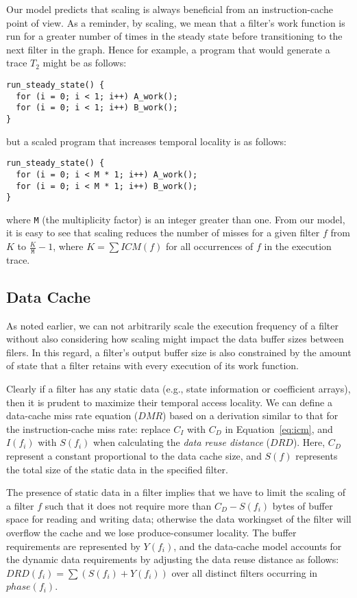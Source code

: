 Our model predicts that scaling is always beneficial from an
instruction-cache point of view. As a reminder, by scaling, we mean
that a filter's work function is run for a greater number of times in
the steady state before transitioning to the next filter in the
graph. Hence for example, a program that would generate a trace $T_2$
might be as follows:
\begin{verbatim}
run_steady_state() {
  for (i = 0; i < 1; i++) A_work();
  for (i = 0; i < 1; i++) B_work();
}
\end{verbatim}
but a scaled program that increases temporal locality is as follows:
\begin{verbatim}
run_steady_state() {
  for (i = 0; i < M * 1; i++) A_work();
  for (i = 0; i < M * 1; i++) B_work();
}
\end{verbatim}
where \texttt{M} (the multiplicity factor) is an integer greater than
one. From our model, it is easy to see that scaling reduces the number
of misses for a given filter $f$ from $K$ to $\frac{K}{\texttt{M}}- 1$, where $K =
\sum ICM(f)$ for all occurrences of $f$ in  the execution trace.

\subsection{Data Cache}

As noted earlier, we can not arbitrarily scale the execution frequency
of a filter without also considering how scaling might impact
the data buffer sizes between filers. In this regard, a filter's
output buffer size is also constrained by the amount of state that a
filter retains with every execution of its work function.

Clearly if a filter has any static data (e.g., state information or
coefficient arrays), then it is prudent to maximize their temporal
access locality. We can define a data-cache miss rate equation ($DMR$) based on
a derivation similar to that for the instruction-cache miss rate:
replace $C_I$ with $C_D$ in Equation~\ref{eq:icm}, and $I(f_i)$ with
$S(f_i)$ when calculating the {\it data reuse distance} ($DRD$). 
Here, $C_D$ represent a constant proportional to the data cache size,
and $S(f)$ represents the total size of the static data in the
specified filter.

The presence of static data in a filter implies that we have to limit
the scaling of a filter $f$ such that it does not require more than $C_D -
S(f_i)$ bytes of buffer space for reading and writing data; otherwise
the data workingset of the filter will overflow the cache and we lose
produce-consumer locality. The buffer requirements are represented by
$Y(f_i)$, and the data-cache model accounts for the dynamic data
requirements by adjusting the data reuse distance as follows:
$DRD(f_i) = \sum (S(f_i) + Y(f_i))$ over all distinct filters occurring
in $phase(f_i)$.

